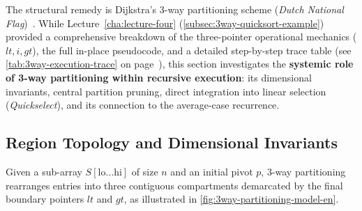 The structural remedy is Dijkstra's 3-way partitioning scheme (\textit{Dutch National Flag})~\cite{dijkstra1976}. While Lecture~\ref{cha:lecture-four} (\autoref{subsec:3way-quicksort-example}) provided a comprehensive breakdown of the three-pointer operational mechanics ($lt, i, gt$), the full in-place pseudocode, and a detailed step-by-step trace table (see \autoref{tab:3way-execution-trace} on page~\pageref{tab:3way-execution-trace}), this section investigates the \textbf{systemic role of 3-way partitioning within recursive execution}: its dimensional invariants, central partition pruning, direct integration into linear selection (\textit{Quickselect}), and its connection to the average-case recurrence.

\subsection{Region Topology and Dimensional Invariants}
\label{subsec:3way-invariants-dimensional}

Given a sub-array $S[\text{lo} \dots \text{hi}]$ of size $n$ and an initial pivot $p$, 3-way partitioning rearranges entries into three contiguous compartments demarcated by the final boundary pointers $lt$ and $gt$, as illustrated in \autoref{fig:3way-partitioning-model-en}.

